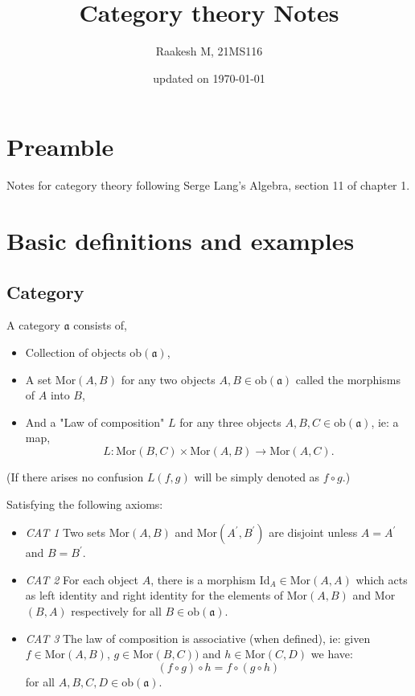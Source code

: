 \documentclass[11pt,a4paper]{colorart}
\title{Category theory Notes}
\author{Raakesh M, 21MS116}
\date{updated on \today}
\def\mab{\mathfrak}
\def\rar{\rightarrow}
\def\tx{\times}
\def\oo{\circ}
\begin{document}
\maketitle
\tableofcontents
\newpage

\section{Preamble}

Notes for category theory following Serge Lang's Algebra, section 11 of chapter 1.

\section{Basic definitions and examples}

\subsection{Category}

\begin{definition}[Category]
	A category $\mab{a}$ consists of,
	\begin{itemize}
		\item Collection of objects ob$(\mab{a})$,
		\item A set Mor$(A,B)$ for any two objects $A,B \in \text{ob}(\mab{a})$ called the morphisms of $A$ into $B$,
		\item And a "Law of composition" $L$ for any three objects $A,B,C \in \text{ob}(\mab{a})$, ie: a map,
		\[ L : \text{Mor}(B,C) \tx \text{Mor}(A,B) \rar \text{Mor}(A,C). \]
	\end{itemize}

	(If there arises no confusion $L(f,g)$ will be simply denoted as $f\oo g$.)

	Satisfying the following axioms:

	\begin{itemize}
		\item \textit{CAT 1} Two sets Mor$(A,B)$ and Mor$(A^\prime,B^\prime)$ are disjoint unless $A=A^\prime$ and $B=B^\prime$.
		\item \textit{CAT 2} For each object $A$, there is a morphism Id$_A \in \text{Mor}(A,A)$ which acts as left identity and right identity for the elements of Mor$(A,B)$ and Mor$(B,A)$ respectively for all $B \in \text{ob}(\mab{a})$.
		\item \textit{CAT 3} The law of composition is associative (when defined), ie: given $f \in \text{Mor}(A,B)$, $g \in \text{Mor}(B,C))$ and $h \in \text{Mor}(C,D)$ we have:
			\[ (f \oo g) \oo h = f \oo (g \oo h) \]
			for all $A,B,C,D \in \text{ob}(\mab{a})$.
	\end{itemize}

\end{definition} 
\end{document}
